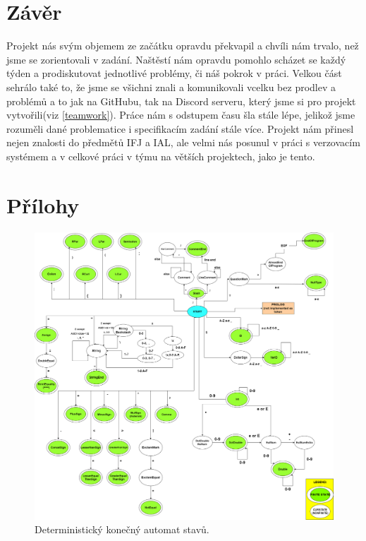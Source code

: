 \documentclass[a4paper, 12pt]{article}
\begin{document}
    \section{Závěr}
    Projekt nás svým objemem ze začátku opravdu překvapil a chvíli nám trvalo, než jsme se zorientovali v zadání. Naštěstí nám opravdu pomohlo scházet se každý týden a prodiskutovat jednotlivé problémy, či náš pokrok v práci. Velkou část sehrálo také to, že jsme se všichni znali a komunikovali vcelku bez prodlev a problémů a to jak na GitHubu, tak na Discord serveru, který jsme si pro projekt vytvořili(viz \ref{teamwork}). Práce nám s odstupem času šla stále lépe, jelikož jsme rozuměli dané problematice i specifikacím zadání stále více. Projekt nám přinesl nejen znalosti do předmětů IFJ a IAL, ale velmi nás posunul v práci s verzovacím systémem a v celkové práci v týmu na větších projektech, jako je tento.
    \newpage
    \section{Přílohy}
    \begin{figure}[H]
        \includegraphics[width=\textwidth]{src/deterministicStateMachine_finall.png}
        \caption{Deterministický konečný automat stavů.}
        \label{Konecny automat}
    \end{figure}
\end{document}
